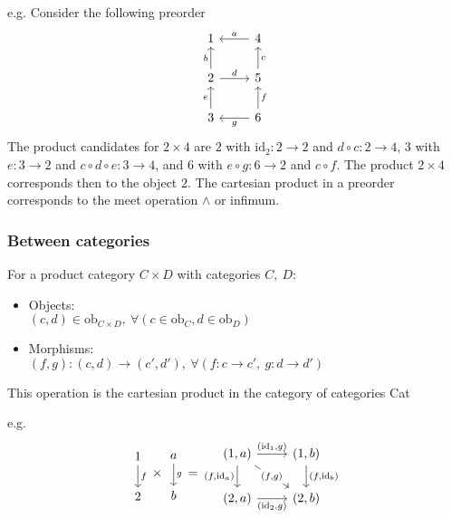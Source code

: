 e.g.
Consider the following preorder
\[\begin{tikzcd}
	1 & 4 \\
	2 & 5 \\
	3 & 6
	\arrow["g", from=3-2, to=3-1]
	\arrow["f"', from=3-2, to=2-2]
	\arrow["c"', from=2-2, to=1-2]
	\arrow["e", from=3-1, to=2-1]
	\arrow["b", from=2-1, to=1-1]
	\arrow["a"', from=1-2, to=1-1]
	\arrow["d", from=2-1, to=2-2]
\end{tikzcd}\]
The product candidates for $2\times 4$ are $2$ with $\mathrm{id}_2 : 2\to 2$
and $d\circ c:2\to 4$, $3$ with $e: 3\to 2$ and $c\circ d\circ e: 3\to 4$,
and $6$ with $e \circ g: 6\to 2$ and $c\circ f$. The product $2\times 4$
corresponds then to the object $2$. The cartesian product in a
preorder corresponds to the meet operation $\land$ or infimum.
\cite{7sketches_compositionality}

\subsubsection*{Between categories}
\cite{nlab:product_category} For a product category $C\times D$ with categories
$C,\ D$:
\begin{itemize}
  \item Objects:\\
    $(c, d) \in \mathrm{ob}_{C\times D},\ \forall (c \in \mathrm{ob}_C, d \in \mathrm{ob}_D)$
  \item Morphisms:\\
    $(f,g) : (c,d) \to (c', d'),\ \forall (f: c \to c',\ g:d \to d')$
\end{itemize}
This operation is the cartesian product in the category of categories Cat

e.g.
\[
\begin{tikzcd}
	1 \\
	2
	\arrow["f", from=1-1, to=2-1]
\end{tikzcd}
\times
\begin{tikzcd}
	a \\
	b
	\arrow["g", from=1-1, to=2-1]
\end{tikzcd}
=
\begin{tikzcd}
	{(1,a)} & {(1,b)} \\
	{(2,a)} & {(2,b)}
	\arrow["{(\mathrm{id}_1,g)}", from=1-1, to=1-2]
	\arrow["{(f,\mathrm{id}_a)}"', from=1-1, to=2-1]
	\arrow["{(\mathrm{id}_2,g)}"', from=2-1, to=2-2]
	\arrow["{(f,\mathrm{id}_b)}", from=1-2, to=2-2]
	\arrow["{(f,g)}"{description}, from=1-1, to=2-2]
\end{tikzcd}
\]